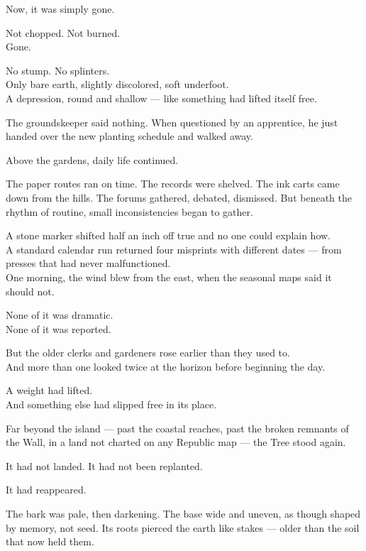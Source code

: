 \documentclass[12pt]{article}
\begin{document}
Now, it was simply gone.

Not chopped. Not burned.\\
Gone.

No stump. No splinters.\\
Only bare earth, slightly discolored, soft underfoot.\\
A depression, round and shallow --- like something had lifted itself free.

The groundskeeper said nothing. When questioned by an apprentice, he just handed over the new planting schedule and walked away.

\vspace{1em}

Above the gardens, daily life continued.

The paper routes ran on time. The records were shelved. The ink carts came down from the hills. The forums gathered, debated, dismissed. But beneath the rhythm of routine, small inconsistencies began to gather.

A stone marker shifted half an inch off true and no one could explain how.\\
A standard calendar run returned four misprints with different dates --- from presses that had never malfunctioned.\\
One morning, the wind blew from the east, when the seasonal maps said it should not.

None of it was dramatic.\\
None of it was reported.

But the older clerks and gardeners rose earlier than they used to.\\
And more than one looked twice at the horizon before beginning the day.

A weight had lifted.\\
And something else had slipped free in its place.

\vspace{1em}

Far beyond the island --- past the coastal reaches, past the broken remnants of the Wall, in a land not charted on any Republic map --- the Tree stood again.

It had not landed. It had not been replanted.

It had reappeared.

The bark was pale, then darkening. The base wide and uneven, as though shaped by memory, not seed. Its roots pierced the earth like stakes --- older than the soil that now held them.
\end{document}
